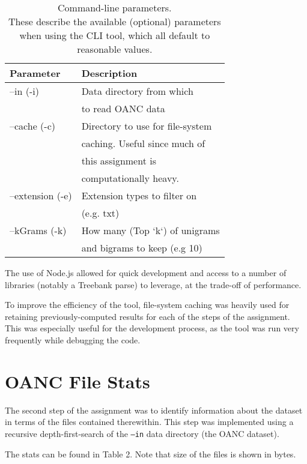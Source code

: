 \documentclass[11pt]{article}
\begin{document}
\begin{table}[h]
\begin{center}
\begin{tabular}{|l|l|}
\hline \bf Parameter & \bf Description \\ \hline
--in (-i)            & Data directory from which \\
                     & to read OANC data \\
--cache (-c)         & Directory to use for file-system \\
                     & caching. Useful since much of \\
                     & this assignment is \\
                     & computationally heavy. \\
--extension (-e)     & Extension types to filter on \\
                     & (e.g. txt) \\
--kGrams (-k)        & How many (Top `k`) of unigrams \\
                     & and bigrams to keep (e.g 10) \\
\hline
\end{tabular}
\end{center}
\caption{\label{cliParams} Command-line parameters. \\
These describe the available (optional) parameters when using
the CLI tool, which all default to reasonable values.}
\end{table}

The use of Node.js allowed for quick development and access to a number
of libraries (notably a Treebank parse) to leverage, at the trade-off of performance.

To improve the efficiency of the tool, file-system caching was heavily used for retaining
previously-computed results for each of the steps of the assignment.  This was especially
useful for the development process, as the tool was run very frequently while debugging
the code.

\section{OANC File Stats}
The second step of the assignment was to identify information about the dataset in terms
of the files contained therewithin.  This step was implemented using a recursive
depth-first-search of the {\tt --in} data directory (the OANC dataset).

The stats can be found in Table 2. Note that size of the files is shown in bytes.
\end{document}
